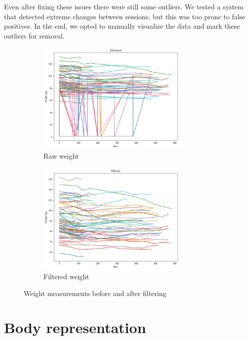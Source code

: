 Even after fixing these issues there were still some outliers. We tested a
system that detected extreme changes between sessions, but this was too prone
to false positives. In the end, we opted to manually visualize the data and
mark these outliers for removal.

\begin{figure}[h]
    \centering
    \begin{subfigure}{\textwidth}
        \centering
        \includegraphics[width=0.8\textwidth]{files/weight_unfiltered}
        \caption{Raw weight}
    \end{subfigure}
    \begin{subfigure}{\textwidth}
        \centering
        \includegraphics[width=0.8\textwidth]{files/weight_filtered}
        \caption{Filtered weight}
    \end{subfigure}
    \caption{Weight measurements before and after filtering}
\end{figure}

\section{Body representation}


